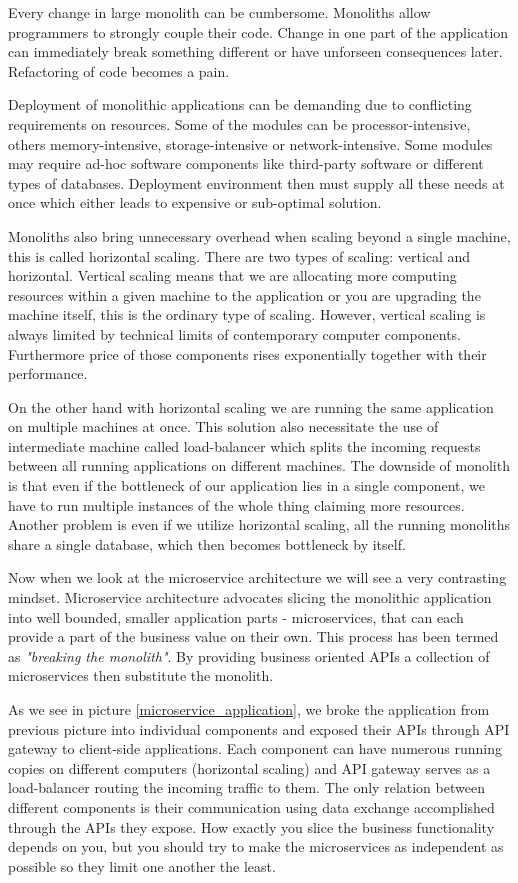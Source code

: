 \documentclass[12pt,oneside]{fithesis2}
\begin{document}
Every change in large monolith can be cumbersome. Monoliths allow programmers to strongly couple their code. Change in one part of the application can immediately break something different or have unforseen consequences later. Refactoring of code becomes a pain.

Deployment of monolithic applications can be demanding due to conflicting  requirements on resources. Some of the modules can be processor-intensive, others memory-intensive, storage-intensive or network-intensive. Some modules may require ad-hoc software components like third-party software or different types of databases. Deployment environment then must supply all these needs at once which either leads to expensive or sub-optimal solution.

Monoliths also bring unnecessary overhead when scaling beyond a single machine, this is called horizontal scaling. There are two types of scaling: vertical and horizontal. Vertical scaling means that we are allocating more computing resources within a given machine to the application or you are upgrading the machine itself, this is the ordinary type of scaling. However, vertical scaling is always limited by technical limits of contemporary computer components. Furthermore price of those components rises exponentially together with their performance.

On the other hand with horizontal scaling we are running the same application on multiple machines at once. This solution also necessitate the use of intermediate machine called load-balancer which splits the incoming requests between all running applications on different machines. The downside of monolith is that even if the bottleneck of our application lies in a single component, we have to run multiple instances of the whole thing claiming more resources. Another problem is even if we utilize horizontal scaling, all the running monoliths share a single database, which then becomes bottleneck by itself.

Now when we look at the microservice architecture we will see a very contrasting mindset. Microservice architecture advocates slicing the monolithic application into well bounded, smaller application parts - microservices, that can each provide a part of the business value on their own. This process has been termed as \textit{"breaking the monolith"}. By providing business oriented APIs a collection of microservices then substitute the monolith.

As we see in picture \ref{microservice_application}, we broke the application from previous picture into individual components and exposed their APIs through API gateway to client-side applications. Each component can have numerous running copies on different computers (horizontal scaling) and API gateway serves as a load-balancer routing the incoming traffic to them. The only relation between different components is their communication using data exchange accomplished through the APIs they expose. How exactly you slice the business functionality depends on you, but you should try to make the microservices as independent as possible so they limit one another the least.
\end{document}
